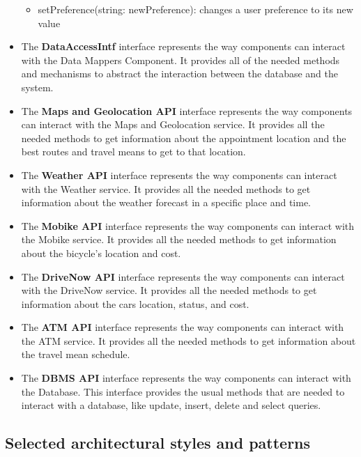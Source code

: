\documentclass[12pt]{article}
\begin{document}
\begin{itemize}
\begin{itemize}
        \item setPreference(string: newPreference): changes a user preference to its new value
    \end{itemize}
    \item The \textbf{DataAccessIntf} interface represents the way components can interact with the Data Mappers Component. It provides all of the needed methods and mechanisms to abstract the interaction between the database and the system.
    \item The \textbf{Maps and Geolocation API} interface represents the way components can interact with the Maps and Geolocation service. It provides all the needed methods to get information about the appointment location and the best routes and travel means to get to that location.
    \item The \textbf{Weather API} interface represents the way components can interact with the Weather service. It provides all the needed methods to get information about the weather forecast in a specific place and time.
    \item The \textbf{Mobike API} interface represents the way components can interact with the Mobike service. It provides all the needed methods to get information about the bicycle's location and cost.
    \item The \textbf{DriveNow API} interface represents the way components can interact with the DriveNow service. It provides all the needed methods to get information about the cars location, status, and cost.
    \item The \textbf{ATM API} interface represents the way components can interact with the ATM service. It provides all the needed methods to get information about the travel mean schedule.
    \item The \textbf{DBMS API} interface represents the way components can interact with the Database. This interface provides the usual methods that are needed to interact with a database, like update, insert, delete and select queries.
\end{itemize}


\subsection{Selected architectural styles and patterns}
\end{document}

